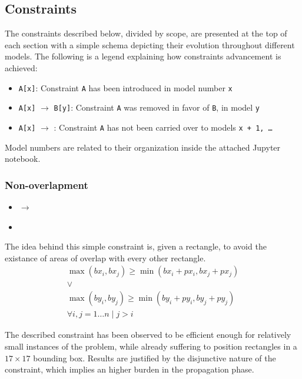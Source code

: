 \documentclass[a4paper,10pt]{article}
\newcommand{\xmark}{\ding{55}}%
\newcounter{subsubsubsection}[subsubsection]
\begin{document}
\subsection{Constraints} \label{sec:cp-constraints}
The constraints described below, divided by scope, are presented at the top of each section with a simple schema depicting their evolution throughout different models.
The following is a legend explaining how constraints advancement is achieved:
\begin{itemize}
   \item \texttt{A[x]}: Constraint \texttt{A} has been introduced in model number \texttt{x}
   \item \texttt{A[x]} $\rightarrow$ \texttt{B[y]}: Constraint \texttt{A} was removed in favor of \texttt{B}, in model \texttt{y}
   \item \texttt{A[x]} $\rightarrow$ \xmark: Constraint \texttt{A} has not been carried over to models \texttt{x + 1, \dots}
\end{itemize}
Model numbers are related to their organization inside the attached Jupyter notebook.

\subsubsection{Non-overlapment}
\begin{itemize}
   \item {} $\rightarrow$ 
   \item {}
\end{itemize}

 \label{sec:presents-cannot-overlap}
The idea behind this simple constraint is, given a rectangle, to avoid the existance of areas of overlap with every other rectangle.
\begin{gather*}
   \max({bx_{i}, bx_{j}}) \geq \min({bx_{i} + px_{i}, bx_{j} + px_{j}}) \\
   \vee \\
   \max({by_{i}, by_{j}}) \geq \min({by_{i} + py_{i}, by_{j} + py_{j}}) \\
   \forall{i, j = 1 \dots n \mid j > i}
\end{gather*}

The described constraint has been observed to be efficient enough for relatively small instances of the problem, while already suffering to position rectangles in a $17 \times 17$ bounding box. Results are justified by the disjunctive nature of the constraint, which implies an higher burden in the propagation phase.
\end{document}
